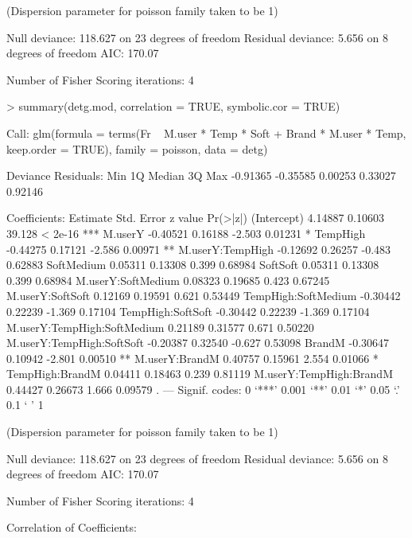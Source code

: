 \documentclass{article}
\begin{document}
\begin{Schunk}
\begin{Soutput}
(Dispersion parameter for poisson family taken to be 1)

    Null deviance: 118.627  on 23  degrees of freedom
Residual deviance:   5.656  on  8  degrees of freedom
AIC: 170.07

Number of Fisher Scoring iterations: 4


> summary(detg.mod, correlation = TRUE, symbolic.cor = TRUE)

Call:
glm(formula = terms(Fr ~ M.user * Temp * Soft + Brand * M.user * 
    Temp, keep.order = TRUE), family = poisson, data = detg)

Deviance Residuals: 
     Min        1Q    Median        3Q       Max  
-0.91365  -0.35585   0.00253   0.33027   0.92146  

Coefficients:
                            Estimate Std. Error z value Pr(>|z|)    
(Intercept)                  4.14887    0.10603  39.128  < 2e-16 ***
M.userY                     -0.40521    0.16188  -2.503  0.01231 *  
TempHigh                    -0.44275    0.17121  -2.586  0.00971 ** 
M.userY:TempHigh            -0.12692    0.26257  -0.483  0.62883    
SoftMedium                   0.05311    0.13308   0.399  0.68984    
SoftSoft                     0.05311    0.13308   0.399  0.68984    
M.userY:SoftMedium           0.08323    0.19685   0.423  0.67245    
M.userY:SoftSoft             0.12169    0.19591   0.621  0.53449    
TempHigh:SoftMedium         -0.30442    0.22239  -1.369  0.17104    
TempHigh:SoftSoft           -0.30442    0.22239  -1.369  0.17104    
M.userY:TempHigh:SoftMedium  0.21189    0.31577   0.671  0.50220    
M.userY:TempHigh:SoftSoft   -0.20387    0.32540  -0.627  0.53098    
BrandM                      -0.30647    0.10942  -2.801  0.00510 ** 
M.userY:BrandM               0.40757    0.15961   2.554  0.01066 *  
TempHigh:BrandM              0.04411    0.18463   0.239  0.81119    
M.userY:TempHigh:BrandM      0.44427    0.26673   1.666  0.09579 .  
---
Signif. codes:  0 ‘***’ 0.001 ‘**’ 0.01 ‘*’ 0.05 ‘.’ 0.1 ‘ ’ 1

(Dispersion parameter for poisson family taken to be 1)

    Null deviance: 118.627  on 23  degrees of freedom
Residual deviance:   5.656  on  8  degrees of freedom
AIC: 170.07

Number of Fisher Scoring iterations: 4

Correlation of Coefficients:
                                                           

\end{Soutput}
\end{Schunk}
\end{document}
